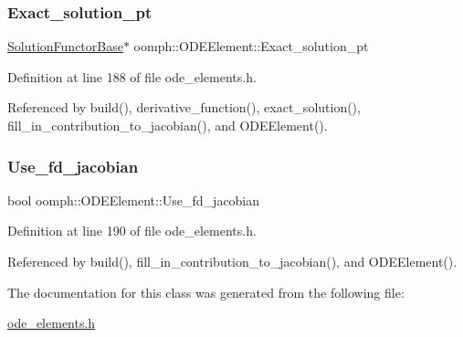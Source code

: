 \subsubsection{\texorpdfstring{Exact\+\_\+solution\+\_\+pt}{Exact\_solution\_pt}}
{\footnotesize\ttfamily \hyperlink{classoomph_1_1SolutionFunctorBase}{Solution\+Functor\+Base}$\ast$ oomph\+::\+O\+D\+E\+Element\+::\+Exact\+\_\+solution\+\_\+pt}



Definition at line 188 of file ode\+\_\+elements.\+h.



Referenced by build(), derivative\+\_\+function(), exact\+\_\+solution(), fill\+\_\+in\+\_\+contribution\+\_\+to\+\_\+jacobian(), and O\+D\+E\+Element().

\mbox{\label{classoomph_1_1ODEElement_a4d1119b79288a81c14cd7b462ca5eee6}} 
\subsubsection{\texorpdfstring{Use\+\_\+fd\+\_\+jacobian}{Use\_fd\_jacobian}}
{\footnotesize\ttfamily bool oomph\+::\+O\+D\+E\+Element\+::\+Use\+\_\+fd\+\_\+jacobian}



Definition at line 190 of file ode\+\_\+elements.\+h.



Referenced by build(), fill\+\_\+in\+\_\+contribution\+\_\+to\+\_\+jacobian(), and O\+D\+E\+Element().



The documentation for this class was generated from the following file\+:\begin{DoxyCompactItemize}
\item 
\hyperlink{ode__elements_8h}{ode\+\_\+elements.\+h}\end{DoxyCompactItemize}
